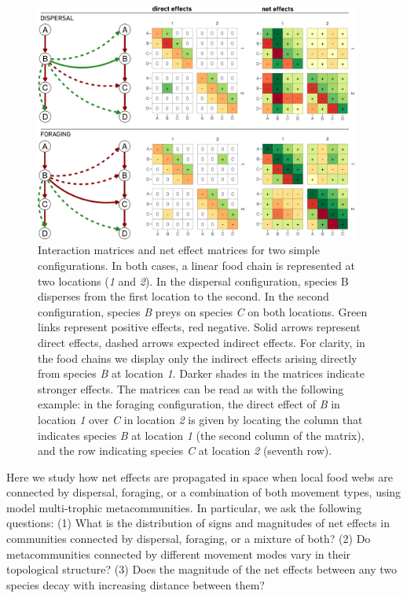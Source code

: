 \begin{figure}[!ht]
\includegraphics[width=0.95\textwidth,height=\textheight,keepaspectratio]{./Figures/chapter05/Fig_1.png}
\caption[Direct and net effects example]{\color{Gray}Interaction matrices and net effect matrices for two simple configurations. In both cases, a linear food chain is represented at two locations (\textit{1} and \textit{2}). In the dispersal configuration, species B disperses from the first location to the second. In the second configuration, species \textit{B} preys on species \textit{C} on both locations. Green links represent positive effects, red negative. Solid arrows represent direct effects, dashed arrows expected indirect effects. For clarity, in the food chains we display only the indirect effects arising directly from species \textit{B} at location \textit{1}. Darker shades in the matrices indicate stronger effects. The matrices can be read as with the following example: in the foraging configuration, the direct effect of \textit{B} in location \textit{1} over \textit{C} in location \textit{2} is given by locating the column that indicates species \textit{B} at location \textit{1} (the second column of the matrix), and the row indicating species \textit{C} at location \textit{2} (seventh row). }\label{fig:fig5.1}
\end{figure}

Here we study how net effects are propagated in space when local food webs are connected by dispersal, foraging, or a combination of both movement types, using model multi-trophic metacommunities. In particular, we ask the following questions: (1) What is the distribution of signs and magnitudes of net effects in communities connected by dispersal, foraging, or a mixture of both? (2) Do metacommunities connected by different movement modes vary in their topological structure? (3) Does the magnitude of the net effects between any two species decay with increasing distance between them?

